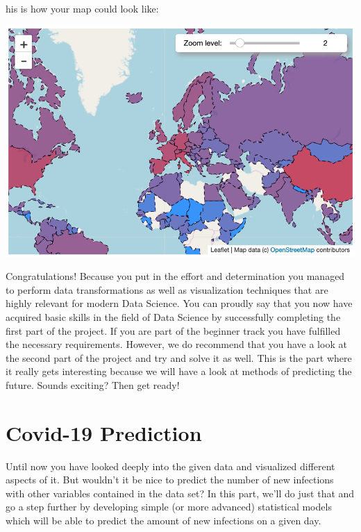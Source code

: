 \documentclass[
  11pt,
]{article}
\newenvironment{tipsp}[1]
  {
  \begin{itemize}
  \footnotesize
  \renewcommand{\labelitemi}{
    \raisebox{-.7\height}[0pt][0pt]{
      {\setkeys{Gin}{width=3em,keepaspectratio}
        \texttt{[image: images/\#1.png]}}
    }
  }
  \setlength{\fboxsep}{1em}
  \begin{pbox}
  \item
  }
  {
  \end{pbox}
  \end{itemize}
  }
\begin{document}
\begin{tipsp}
This is how your map could look like:

\begin{center}\includegraphics[width=1\linewidth]{plots/p-map-color} \end{center}

\end{tipsp}

Congratulations! Because you put in the effort and determination you managed to perform data transformations as well as visualization techniques that are highly relevant for modern Data Science. You can proudly say that you now have acquired basic skills in the field of Data Science by successfully completing the first part of the project. If you are part of the beginner track you have fulfilled the necessary requirements. However, we do recommend that you have a look at the second part of the project and try and solve it as well. This is the part where it really gets interesting because we will have a look at methods of predicting the future. Sounds exciting? Then get ready!

\newpage

\hypertarget{covid-19-prediction}{%
\section{Covid-19 Prediction}\label{covid-19-prediction}}

Until now you have looked deeply into the given data and visualized different aspects of it. But wouldn't it be nice to predict the number of new infections with other variables contained in the data set? In this part, we'll do just that and go a step further by developing simple (or more advanced) statistical models which will be able to predict the amount of new infections on a given day.
\end{document}
